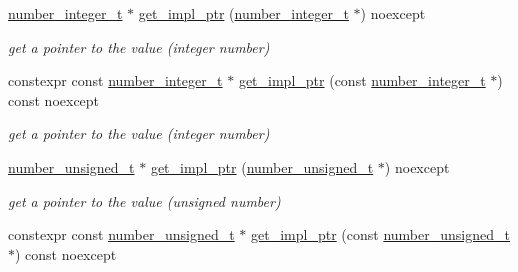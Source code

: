\begin{DoxyCompactItemize}
\hyperlink{classnlohmann_1_1basic__json_ac4b10b2364f26ce47bdb9a413ff04a59}{number\+\_\+integer\+\_\+t} $\ast$ \hyperlink{classnlohmann_1_1basic__json_abc4941c0dd9392b813a34ce8d9719eef}{get\+\_\+impl\+\_\+ptr} (\hyperlink{classnlohmann_1_1basic__json_ac4b10b2364f26ce47bdb9a413ff04a59}{number\+\_\+integer\+\_\+t} $\ast$) noexcept
\begin{DoxyCompactList}\small\item\em get a pointer to the value (integer number) \end{DoxyCompactList}\item 
\hypertarget{classnlohmann_1_1basic__json_ab8bce612d50a204f833e553e7c263f07}{}\label{classnlohmann_1_1basic__json_ab8bce612d50a204f833e553e7c263f07} 
constexpr const \hyperlink{classnlohmann_1_1basic__json_ac4b10b2364f26ce47bdb9a413ff04a59}{number\+\_\+integer\+\_\+t} $\ast$ \hyperlink{classnlohmann_1_1basic__json_ab8bce612d50a204f833e553e7c263f07}{get\+\_\+impl\+\_\+ptr} (const \hyperlink{classnlohmann_1_1basic__json_ac4b10b2364f26ce47bdb9a413ff04a59}{number\+\_\+integer\+\_\+t} $\ast$) const noexcept
\begin{DoxyCompactList}\small\item\em get a pointer to the value (integer number) \end{DoxyCompactList}\item 
\hypertarget{classnlohmann_1_1basic__json_a4a99eaec8caf57b146898f542affe0f8}{}\label{classnlohmann_1_1basic__json_a4a99eaec8caf57b146898f542affe0f8} 
\hyperlink{classnlohmann_1_1basic__json_a60a04166c122072ab11eaf9845d9cd1d}{number\+\_\+unsigned\+\_\+t} $\ast$ \hyperlink{classnlohmann_1_1basic__json_a4a99eaec8caf57b146898f542affe0f8}{get\+\_\+impl\+\_\+ptr} (\hyperlink{classnlohmann_1_1basic__json_a60a04166c122072ab11eaf9845d9cd1d}{number\+\_\+unsigned\+\_\+t} $\ast$) noexcept
\begin{DoxyCompactList}\small\item\em get a pointer to the value (unsigned number) \end{DoxyCompactList}\item 
\hypertarget{classnlohmann_1_1basic__json_a41738fc6cd1116162f276f9f7d02a240}{}\label{classnlohmann_1_1basic__json_a41738fc6cd1116162f276f9f7d02a240} 
constexpr const \hyperlink{classnlohmann_1_1basic__json_a60a04166c122072ab11eaf9845d9cd1d}{number\+\_\+unsigned\+\_\+t} $\ast$ \hyperlink{classnlohmann_1_1basic__json_a41738fc6cd1116162f276f9f7d02a240}{get\+\_\+impl\+\_\+ptr} (const \hyperlink{classnlohmann_1_1basic__json_a60a04166c122072ab11eaf9845d9cd1d}{number\+\_\+unsigned\+\_\+t} $\ast$) const noexcept

\end{DoxyCompactItemize}
